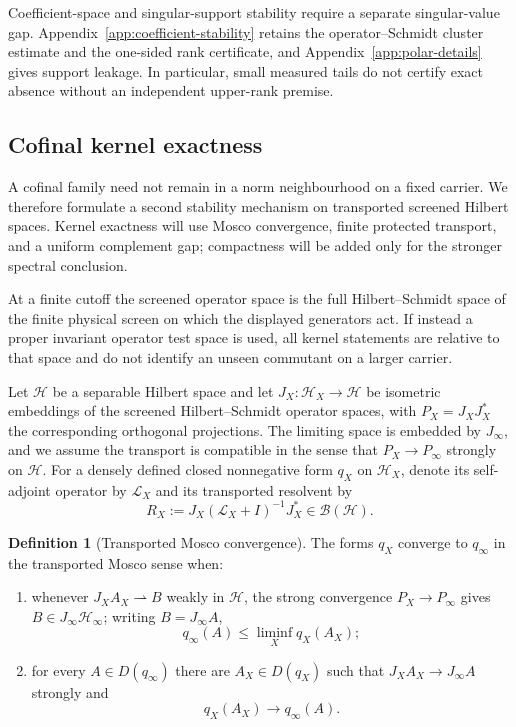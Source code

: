 \documentclass[11pt]{article}
\numberwithin{equation}{section}
\theoremstyle{definition}
\newtheorem{definition}[theorem]{Definition}
\theoremstyle{remark}
\begin{document}
Coefficient-space and singular-support stability require a separate
singular-value gap.  Appendix~\ref{app:coefficient-stability} retains the
operator--Schmidt cluster estimate and the one-sided rank certificate, and
Appendix~\ref{app:polar-details} gives support leakage.  In particular,
small measured tails do not certify exact absence without an independent
upper-rank premise.


\subsection{Cofinal kernel exactness}
\label{sec:compact-mosco}

A cofinal family need not remain in a norm neighbourhood on a fixed carrier.
We therefore formulate a second stability mechanism on transported screened
Hilbert spaces.  Kernel exactness will use Mosco convergence, finite protected
transport, and a uniform complement gap; compactness will be added only for
the stronger spectral conclusion.

At a finite cutoff the screened operator space is the full
Hilbert--Schmidt space of the finite physical screen on which the displayed
generators act.  If instead a proper invariant operator test space is used,
all kernel statements are relative to that space and do not identify an
unseen commutant on a larger carrier.

Let $\mathscr H$ be a separable Hilbert space and let
$J_X:\mathscr H_X\to\mathscr H$ be isometric embeddings of the screened
Hilbert--Schmidt operator spaces, with $P_X=J_XJ_X^*$ the corresponding
orthogonal projections.  The limiting space is embedded by $J_\infty$, and we
assume the transport is compatible in the sense that
$P_X\to P_\infty$ strongly on $\mathscr H$.  For a densely defined closed
nonnegative form $q_X$ on $\mathscr H_X$, denote
its self-adjoint operator by $\mathscr L_X$ and its transported resolvent by
\begin{equation}
R_X:=J_X(\mathscr L_X+I)^{-1}J_X^*\in\mathcal B(\mathscr H).
\label{eq:transported-resolvent}
\end{equation}

\begin{definition}[Transported Mosco convergence]
\label{def:transported-mosco}
The forms $q_X$ converge to $q_\infty$ in the transported Mosco sense when:
\begin{enumerate}[label=\textup{(M\arabic*)},leftmargin=3em]
\item whenever $J_XA_X\rightharpoonup B$ weakly in $\mathscr H$, the strong
      convergence $P_X\to P_\infty$ gives $B\in J_\infty\mathscr H_\infty$;
      writing $B=J_\infty A$,
\[
 q_\infty(A)\le\liminf_X q_X(A_X);
\]
\item for every $A\in D(q_\infty)$ there are $A_X\in D(q_X)$ such that
$J_XA_X\to J_\infty A$ strongly and
\[
 q_X(A_X)\longrightarrow q_\infty(A).
\]
\end{enumerate}
\end{definition}
\end{document}
